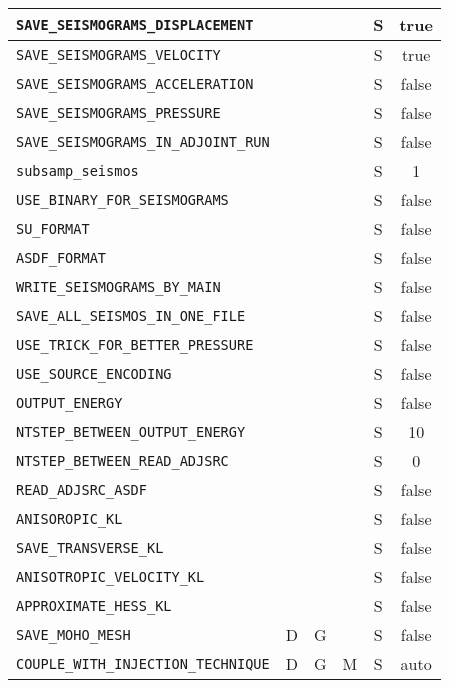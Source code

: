 \begin{longtable}{|p{7.7cm}|c|c|c|c|c|}
      \verb+SAVE_SEISMOGRAMS_DISPLACEMENT+ &   &   &   & S & true \\ \hline
      \verb+SAVE_SEISMOGRAMS_VELOCITY+     &   &   &   & S & true \\ \hline
      \verb+SAVE_SEISMOGRAMS_ACCELERATION+ &   &   &   & S & false \\ \hline
      \verb+SAVE_SEISMOGRAMS_PRESSURE+     &   &   &   & S & false \\ \hline
      \verb+SAVE_SEISMOGRAMS_IN_ADJOINT_RUN+&  &   &   & S & false \\ \hline
      \verb+subsamp_seismos+               &   &   &   & S & 1 \\ \hline
      \verb+USE_BINARY_FOR_SEISMOGRAMS+    &   &   &   & S & false \\ \hline
      \verb+SU_FORMAT+                     &   &   &   & S & false \\ \hline
      \verb+ASDF_FORMAT+                   &   &   &   & S & false \\ \hline
      \verb+WRITE_SEISMOGRAMS_BY_MAIN+     &   &   &   & S & false \\ \hline
      \verb+SAVE_ALL_SEISMOS_IN_ONE_FILE+  &   &   &   & S & false \\ \hline
      \verb+USE_TRICK_FOR_BETTER_PRESSURE+ &   &   &   & S & false \\ \hline
      \verb+USE_SOURCE_ENCODING+           &   &   &   & S & false \\ \hline
      \verb+OUTPUT_ENERGY+                 &   &   &   & S & false \\ \hline
      \verb+NTSTEP_BETWEEN_OUTPUT_ENERGY+  &   &   &   & S & 10 \\ \hline
      \verb+NTSTEP_BETWEEN_READ_ADJSRC+    &   &   &   & S & 0 \\ \hline
      \verb+READ_ADJSRC_ASDF+              &   &   &   & S & false \\ \hline
      \verb+ANISOROPIC_KL+                 &   &   &   & S & false \\ \hline
      \verb+SAVE_TRANSVERSE_KL+            &   &   &   & S & false \\ \hline
      \verb+ANISOTROPIC_VELOCITY_KL+       &   &   &   & S & false \\ \hline
      \verb+APPROXIMATE_HESS_KL+           &   &   &   & S & false \\ \hline
      \verb+SAVE_MOHO_MESH+                & D & G &   & S & false \\ \hline
      \verb+COUPLE_WITH_INJECTION_TECHNIQUE+& D & G& M & S & auto \\ \hline

\end{longtable}
